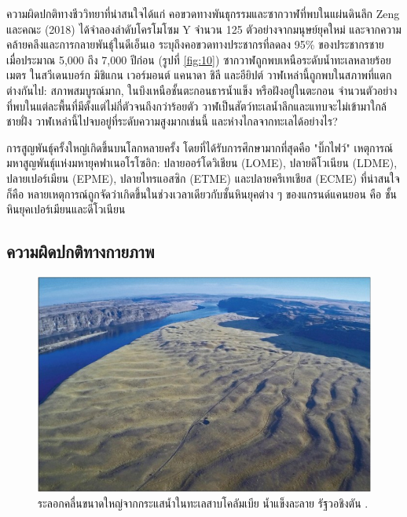 \documentclass[10pt,twocolumn,letterpaper]{article}
\begin{document}
ความผิดปกติทางชีววิทยาที่น่าสนใจได้แก่ คอขวดทางพันธุกรรมและซากวาฬที่พบในแผ่นดินลึก Zeng และคณะ (2018) ได้จำลองลำดับโครโมโซม Y จำนวน 125 ตัวอย่างจากมนุษย์ยุคใหม่ และจากความคล้ายคลึงและการกลายพันธุ์ในดีเอ็นเอ ระบุถึงคอขวดทางประชากรที่ลดลง 95\% ของประชากรชาย เมื่อประมาณ 5,000 ถึง 7,000 ปีก่อน (รูปที่ \ref{fig:10}) \cite{62} ซากวาฬถูกพบเหนือระดับน้ำทะเลหลายร้อยเมตร ในสวีเดนบอร์ก มิชิแกน เวอร์มอนต์ แคนาดา ชิลี และอียิปต์ \cite{63,64,65,66} วาฬเหล่านี้ถูกพบในสภาพที่แตกต่างกันไป: สภาพสมบูรณ์มาก, ในบึงเหนือชั้นตะกอนธารน้ำแข็ง หรือฝังอยู่ในตะกอน จำนวนตัวอย่างที่พบในแต่ละพื้นที่มีตั้งแต่ไม่กี่ตัวจนถึงกว่าร้อยตัว วาฬเป็นสัตว์ทะเลน้ำลึกและแทบจะไม่เข้ามาใกล้ชายฝั่ง วาฬเหล่านี้ไปจบอยู่ที่ระดับความสูงมากเช่นนี้ และห่างไกลจากทะเลได้อย่างไร?

การสูญพันธุ์ครั้งใหญ่เกิดขึ้นบนโลกหลายครั้ง โดยที่ได้รับการศึกษามากที่สุดคือ "บิ๊กไฟว์" เหตุการณ์มหาสูญพันธุ์แห่งมหายุคฟาเนอโรโซอิก: ปลายออร์โดวิเชียน (LOME), ปลายดีโวเนียน (LDME), ปลายเปอร์เมียน (EPME), ปลายไทรแอสซิก (ETME) และปลายครีเทเชียส (ECME) \cite{88,89} ที่น่าสนใจก็คือ หลายเหตุการณ์ถูกจัดว่าเกิดขึ้นในช่วงเวลาเดียวกับชั้นหินยุคต่าง ๆ ของแกรนด์แคนยอน คือ ชั้นหินยุคเปอร์เมียนและดีโวเนียน

\subsection{ความผิดปกติทางกายภาพ}

\begin{figure}[b]
\begin{center}
   \includegraphics[width=1\linewidth]{columbia.jpg}
\end{center}
   \caption{ระลอกคลื่นขนาดใหญ่จากกระแสน้ำในทะเลสาบโคลัมเบีย น้ำแข็งละลาย รัฐวอชิงตัน \cite{80}.}
\label{fig:11}
\label{fig:onecol}
\end{figure}
\end{document}
